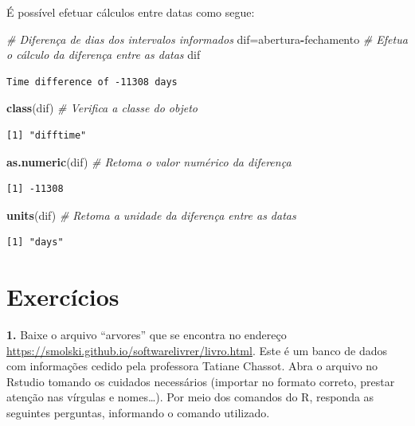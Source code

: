 \documentclass[12pt,brazil,oneside]{book}
\newenvironment{Shaded}{\begin{snugshade}}{\end{snugshade}}
\newcommand{\CommentTok}[1]{\textcolor[rgb]{0.56,0.35,0.01}{\textit{#1}}}
\newcommand{\KeywordTok}[1]{\textcolor[rgb]{0.13,0.29,0.53}{\textbf{#1}}}
\newcommand{\NormalTok}[1]{#1}
\newcommand{\OperatorTok}[1]{\textcolor[rgb]{0.81,0.36,0.00}{\textbf{#1}}}
\begin{document}
É possível efetuar cálculos entre datas como segue:

\begin{Shaded}
\begin{Highlighting}[]
\CommentTok{# Diferença de dias dos intervalos informados}
\NormalTok{dif=abertura}\OperatorTok{-}\NormalTok{fechamento }\CommentTok{# Efetua o cálculo da diferença entre as datas}
\NormalTok{dif}
\end{Highlighting}
\end{Shaded}

\begin{verbatim}
Time difference of -11308 days
\end{verbatim}

\begin{Shaded}
\begin{Highlighting}[]
\KeywordTok{class}\NormalTok{(dif) }\CommentTok{# Verifica a classe do objeto}
\end{Highlighting}
\end{Shaded}

\begin{verbatim}
[1] "difftime"
\end{verbatim}

\begin{Shaded}
\begin{Highlighting}[]
\KeywordTok{as.numeric}\NormalTok{(dif) }\CommentTok{# Retoma o valor numérico da diferença}
\end{Highlighting}
\end{Shaded}

\begin{verbatim}
[1] -11308
\end{verbatim}

\begin{Shaded}
\begin{Highlighting}[]
\KeywordTok{units}\NormalTok{(dif) }\CommentTok{# Retoma a unidade da diferença entre as datas}
\end{Highlighting}
\end{Shaded}

\begin{verbatim}
[1] "days"
\end{verbatim}

\hypertarget{exercicios}{%
\section{Exercícios}\label{exercicios}}

\textbf{1.} Baixe o arquivo ``arvores'' que se encontra no endereço \url{https://smolski.github.io/softwarelivrer/livro.html}. Este é um banco de dados com informações cedido pela professora Tatiane Chassot. Abra o arquivo no Rstudio tomando os cuidados necessários (importar no formato correto, prestar atenção nas vírgulas e nomes\ldots{}). Por meio dos comandos do R, responda as seguintes perguntas, informando o comando utilizado.
\end{document}
